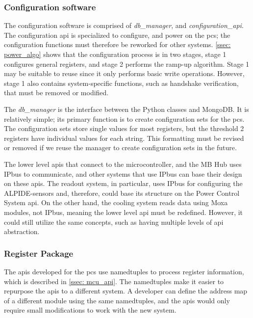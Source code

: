 \documentclass[main.tex]{subfiles}
\begin{document}
\subsubsection{Configuration software}

The configuration software is comprised of \textit{db\_manager}, and \textit{configuration\_api}. The configuration \gls{api} is specialized to configure, and power on the \gls{pcs}; the configuration functions must therefore be reworked for other systems. \autoref{ssec: power_algo} shows that the configuration process is in two stages, stage 1 configures general registers, and stage 2 performs the ramp-up algorithm. Stage 1 may be suitable to reuse since it only performs basic write operations. However, stage 1 also contains system-specific functions, such as handshake verification, that must be removed or modified.

The \textit{db\_manager} is the interface between the Python classes and MongoDB. It is relatively simple; its primary function is to create configuration sets for the \gls{pcs}. The configuration sets store single values for most registers, but the threshold 2 registers have individual values for each string. This formatting must be revised or removed if we reuse the manager to create configuration sets in the future. 

The lower level \gls{api}s that connect to the microcontroller, and the MB Hub uses IPbus to communicate, and other systems that use IPbus can base their design on these \gls{api}s. The readout system, in particular, uses IPbus for configuring the ALPIDE-sensors and, therefore, could base its structure on the Power Control System \gls{api}. On the other hand, the cooling system reads data using Moxa modules, not IPbus, meaning the lower level \gls{api} must be redefined. However, it could still utilize the same concepts, such as having multiple levels of \gls{api} abstraction.
 
 \subsubsection{Register Package}
 
The \gls{api}s developed for the \gls{pcs} use namedtuples to process register information, which is described in \autoref{ssec: mcu_api}. The namedtuples make it easier to repurpose the \gls{api}s to a different system. A developer can define the address map of a different module using the same namedtuples, and the \gls{api}s would only require small modifications to work with the new system.
\end{document}
